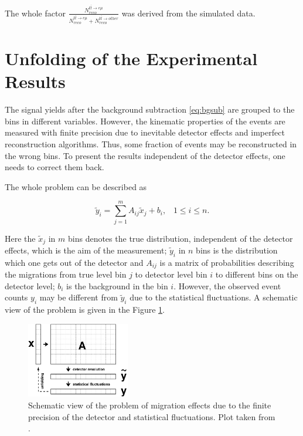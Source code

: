 The whole factor $\frac{N^{t\bar{t} \rightarrow e\mu}_{reco}}{N^{t\bar{t} \rightarrow e\mu}_{reco} + N^{t\bar{t} \rightarrow other}_{reco}}$ was derived
from the simulated data.

\section{Unfolding of the Experimental Results}\label{sec:unfold}

The signal yields after the background  subtraction \ref{eq:bgsub} are grouped to the bins in different variables. However, the kinematic properties
of the events are measured with finite precision due to inevitable detector effects and imperfect reconstruction algorithms.
Thus, some fraction of events may be reconstructed in the wrong bins. To present the results independent of the detector effects,
one needs to correct them back.

The whole problem can be described as

\begin{equation}\label{eq:UnfoldProb}
 \tilde{y}_i = \sum_{j = 1}^{m} A_{ij}\tilde{x}_{j} + b_{i}, \;\;\; 1 \leq i \leq n.
\end{equation}

Here the $\tilde{x}_j$ in $m$ bins denotes the true distribution, independent of the detector effects, which is the aim of the measurement;
$\tilde{y}_i$ in $n$ bins is the distribution which one gets out of the detector and $A_{ij}$ is a matrix of probabilities describing 
the migrations from true level bin $j$ to detector level bin $i$ to different bins on the detector level; $b_{i}$ is the background in the bin $i$. 
However, the observed event counts $y_{i}$ may be different from $\tilde{y}_{i}$ due to the statistical fluctuations.
A schematic view of the problem is given in the Figure \ref{fig:scUnf}.

\begin{figure}[t]
  \centering
  \includegraphics[width=0.4\textwidth]{06_DiffXsec/plots/d12-129f1.png}
  \caption{Schematic view of the problem of migration effects due to the finite precision of the detector and statistical 
  fluctuations. Plot taken from \cite{Schmitt:2012kp}.}
  \label{fig:scUnf}
\end{figure}

